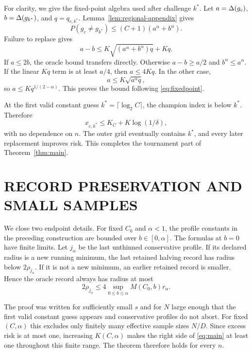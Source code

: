 For clarity, we give the fixed-point algebra used after challenge $k^*$. Let $a=\Delta(g_c)$, $b=\Delta(g_{k^*})$, and $q=q_{c,k^*}$. Lemma~\ref{lem:regional-appendix} gives
\[
 P(g_c\ne g_{k^*})\leq(C+1)(a^\alpha+b^\alpha).
\]
Failure to replace gives
\begin{equation}
 a-b\leq K\sqrt{(a^\alpha+b^\alpha)q}+Kq.
 \label{eq:appendix-fixedpoint}
\end{equation}
If $a\leq2b$, the oracle bound transfers directly. Otherwise $a-b\geq a/2$ and $b^\alpha\leq a^\alpha$. If the linear $Kq$ term is at least $a/4$, then $a\leq4Kq$. In the other case,
\[
 a\leq K\sqrt{a^\alpha q},
\]
so $a\leq Kq^{1/(2-\alpha)}$. This proves the bound following \eqref{eq:fixedpoint}.

At the first valid constant guess $k^*=\lceil\log_2C\rceil$, the champion index is below $k^*$. Therefore
\[
 x_{c,k^*}\leq K_C+K\log(1/\delta),
\]
with no dependence on $n$. The outer grid eventually contains $k^*$, and every later replacement improves risk. This completes the tournament part of Theorem~\ref{thm:main}.

\section{RECORD PRESERVATION AND SMALL SAMPLES}

We close two endpoint details. For fixed $C_0$ and $\alpha<1$, the profile constants in the preceding construction are bounded over $b\in[0,\alpha]$. The formulas at $b=0$ have finite limits. Let $j_\alpha$ be the last unthinned conservative profile. If its declared radius is a new running minimum, the last retained halving record has radius below $2\rho_{j_\alpha}$. If it is not a new minimum, an earlier retained record is smaller. Hence the oracle record always has radius at most
\[
 2\rho_{j_\alpha}
 \leq4\sup_{0\leq b\leq\alpha}M(C_0,b)r_\alpha.
\]

The proof was written for sufficiently small $s$ and for $N$ large enough that the first valid constant guess appears and conservative profiles do not abort. For fixed $(C,\alpha)$ this excludes only finitely many effective sample sizes $N/D$. Since excess risk is at most one, increasing $K(C,\alpha)$ makes the right side of \eqref{eq:main} at least one throughout this finite range. The theorem therefore holds for every $n$.
